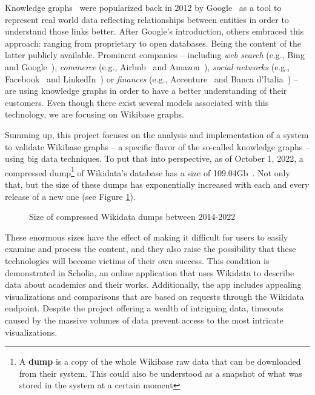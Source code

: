 Knowledge graphs~\cite{https://doi.org/10.48550/arxiv.2110.11709} were popularized back in 2012 by Google~\cite{web:knowledge_graphs:google} as a tool to represent real world data reflecting relationships between entities in order to understand those links better. After Google's introduction, others embraced this approach: ranging from proprietary to open databases. Being the content of the latter publicly available. Prominent companies -- including \textit{web search} (e.g., Bing~\cite{knowledge:graphs:usage:bing} and Google~\cite{web:knowledge_graphs:google}), \textit{commerce} (e.g., Airbnb~\cite{knowledge:graphs:usage:airbnb} and Amazon~\cite{knowledge:graphs:usage:amazon}), \textit{social networks} (e.g., Facebook~\cite{knowledge:graphs:usage:facebook} and LinkedIn~\cite{knowledge:graphs:usage:linkedin}) or \textit{finances} (e.g., Accenture~\cite{knowledge:graphs:usage:accenture} and Banca d'Italia~\cite{https://doi.org/10.48550/arxiv.2010.05172}) -- are using knowledge graphs in order to have a better understanding of their customers. Even though there exist several models associated with this technology, we are focusing on Wikibase graphs.

Summing up, this project focuses on the analysis and implementation of a system to validate Wikibase graphs -- a specific flavor of the so-called knowledge graphs -- using big data techniques. To put that into perspective, as of October 1, 2022, a compressed dump\footnote{A \textbf{dump} is a copy of the whole Wikibase raw data that can be downloaded from their system. This could also be understood as a snapshot of what was stored in the system at a certain moment} of Wikidata's database has a size of 109.04Gb~\cite{wikidata:dumps}. Not only that, but the size of these dumps has exponentially increased with each and every release of a new one (see Figure \ref{fig:dumps}).

\begin{figure}[ht]
    \centering
    
    \caption[Plot showing the size of compressed dumps between 2014-22]{Size of compressed Wikidata dumps between 2014-2022~\cite{https://doi.org/10.48550/arxiv.2110.11709}}
    \label{fig:dumps}
\end{figure}

These enormous sizes have the effect of making it difficult for users to easily examine and process the content, and they also raise the possibility that these technologies will become victims of their own success. This condition is demonstrated in Scholia, an online application that uses Wikidata to describe data about academics and their works. Additionally, the app includes appealing visualizations and comparisons that are based on requests through the Wikidata endpoint. Despite the project offering a wealth of intriguing data, timeouts caused by the massive volumes of data prevent access to the most intricate visualizations.

